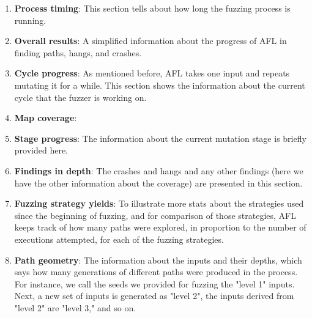 \begin{enumerate}
    \item \textbf{Process timing}: This section tells about how long the fuzzing process is running.
    \item \textbf{Overall results}: A simplified information about the progress of AFL in finding paths, hangs, and crashes. 
    \item \textbf{Cycle progress}: As mentioned before, AFL takes one input and repeats mutating it for a while. This section shows the information about the current cycle that the fuzzer is working on.
    \item \textbf{Map coverage}: 
    \item \textbf{Stage progress}: The information about the current mutation stage is briefly provided here.
    \item \textbf{Findings in depth}: The crashes and hangs and any other findings (here we have the other information about the coverage) are presented in this section.
    \item \textbf{Fuzzing strategy yields}: To illustrate more stats about the strategies used since the beginning of fuzzing, and for comparison of those strategies, AFL keeps track of how many paths were explored, in proportion to the number of executions attempted, for each of the fuzzing strategies.
    \item \textbf{Path geometry}: The information about the inputs and their depths, which says how many generations of different paths were produced in the process. For instance, we call the seeds we provided for fuzzing the "level 1" inputs. Next, a new set of inputs is generated as "level 2", the inputs derived from "level 2" are "level 3," and so on.
\end{enumerate}

